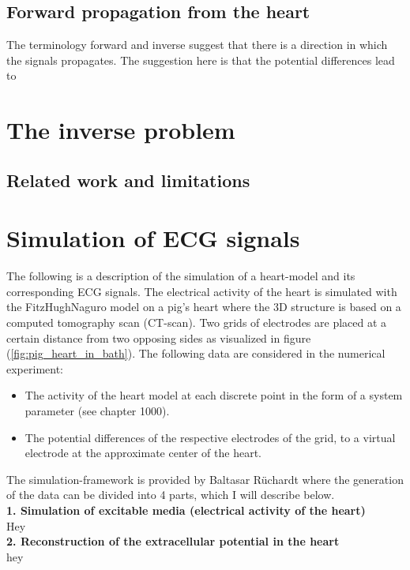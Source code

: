 \subsection{Forward propagation from the heart}
The terminology forward and inverse suggest that there is a direction in which the signals propagates. The suggestion here is that the potential differences lead to  
\section{The inverse problem}


\subsection{Related work and limitations}


\section{Simulation of ECG signals}\label{cap:simulation}
The following is a description of the simulation of a heart-model and its corresponding ECG signals.
The electrical activity of the heart is simulated with the FitzHughNaguro model on a pig's heart where the 3D structure is based on a computed tomography scan (CT-scan). Two grids of electrodes are placed at a certain distance from two opposing sides as visualized in figure (\ref{fig:pig_heart_in_bath}). 
The following data are considered in the numerical experiment: 
\begin{itemize}
    \item The activity of the heart model at each discrete point in the form of a system parameter (see chapter 1000).
    \item The potential differences of the respective electrodes of the grid, to a virtual electrode at the approximate center of the heart.
\end{itemize}
 

The simulation-framework is provided by Baltasar Rüchardt where the generation of the data can be divided into 4 parts, which I will describe below.\\

\textbf{1. Simulation of excitable media (electrical activity of the heart)}\\
Hey\\

\textbf{2. Reconstruction of the extracellular potential in the heart}\\
hey\\

